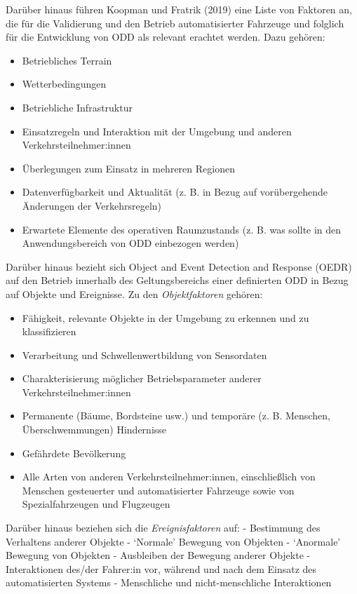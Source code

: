 \documentclass[
]{book}
\providecommand{\tightlist}{%
  \setlength{\itemsep}{0pt}\setlength{\parskip}{0pt}}
\begin{document}
Darüber hinaus führen Koopman und Fratrik (2019) eine Liste von Faktoren an, die für die Validierung und den Betrieb automatisierter Fahrzeuge und folglich für die Entwicklung von ODD als relevant erachtet werden. Dazu gehören:

\begin{itemize}
\tightlist
\item
  Betriebliches Terrain
\item
  Wetterbedingungen
\item
  Betriebliche Infrastruktur
\item
  Einsatzregeln und Interaktion mit der Umgebung und anderen Verkehrsteilnehmer:innen
\item
  Überlegungen zum Einsatz in mehreren Regionen
\item
  Datenverfügbarkeit und Aktualität (z. B. in Bezug auf vorübergehende Änderungen der Verkehrsregeln)
\item
  Erwartete Elemente des operativen Raumzustands (z. B. was sollte in den Anwendungsbereich von ODD einbezogen werden)
\end{itemize}

Darüber hinaus bezieht sich Object and Event Detection and Response (OEDR) auf den Betrieb innerhalb des Geltungsbereichs einer definierten ODD in Bezug auf Objekte und Ereignisse. Zu den \emph{Objektfaktoren} gehören:

\begin{itemize}
\tightlist
\item
  Fähigkeit, relevante Objekte in der Umgebung zu erkennen und zu klassifizieren
\item
  Verarbeitung und Schwellenwertbildung von Sensordaten
\item
  Charakterisierung möglicher Betriebsparameter anderer Verkehrsteilnehmer:innen
\item
  Permanente (Bäume, Bordsteine usw.) und temporäre (z. B. Menschen, Überschwemmungen) Hindernisse
\item
  Gefährdete Bevölkerung
\item
  Alle Arten von anderen Verkehrsteilnehmer:innen, einschließlich von Menschen gesteuerter und automatisierter Fahrzeuge sowie von Spezialfahrzeugen und Flugzeugen
\end{itemize}

Darüber hinaus beziehen sich die \emph{Ereignisfaktoren} auf:
- Bestimmung des Verhaltens anderer Objekte
- `Normale' Bewegung von Objekten
- `Anormale' Bewegung von Objekten
- Ausbleiben der Bewegung anderer Objekte
- Interaktionen des/der Fahrer:in vor, während und nach dem Einsatz des automatisierten Systems
- Menschliche und nicht-menschliche Interaktionen
\end{document}
